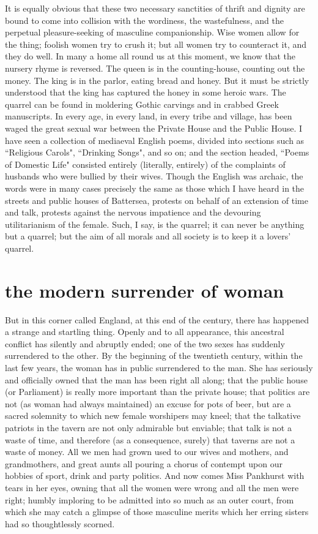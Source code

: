 \documentclass[final,10pt,letterpaper,twocolumn,openany]{book}
\begin{document}
It is equally obvious that these two necessary sanctities of thrift and
dignity are bound to come into collision with the wordiness, the
wastefulness, and the perpetual pleasure-seeking of masculine
companionship. Wise women allow for the thing; foolish women try to
crush it; but all women try to counteract it, and they do well. In many a
home all round us at this moment, we know that the nursery rhyme is
reversed. The queen is in the counting-house, counting out the money. The
king is in the parlor, eating bread and honey. But it must be strictly
understood that the king has captured the honey in some heroic wars. The
quarrel can be found in moldering Gothic carvings and in crabbed Greek
manuscripts. In every age, in every land, in every tribe and village, has
been waged the great sexual war between the Private House and the Public
House. I have seen a collection of mediaeval English poems, divided into
sections such as ``Religious Carols", ``Drinking Songs", and so on; and the
section headed, ``Poems of Domestic Life" consisted entirely (literally,
entirely) of the complaints of husbands who were bullied by their wives.
Though the English was archaic, the words were in many cases precisely
the same as those which I have heard in the streets and public houses of
Battersea, protests on behalf of an extension of time and talk, protests
against the nervous impatience and the devouring utilitarianism of the
female. Such, I say, is the quarrel; it can never be anything but a quarrel;
but the aim of all morals and all society is to keep it a lovers' quarrel.

\section{the modern surrender of woman}

    But in this corner called England, at this end of the century, there has
happened a strange and startling thing. Openly and to all appearance, this
ancestral conflict has silently and abruptly ended; one of the two sexes has
suddenly surrendered to the other. By the beginning of the twentieth
century, within the last few years, the woman has in public surrendered to
the man. She has seriously and officially owned that the man has been
right all along; that the public house (or Parliament) is really more
important than the private house; that politics are not (as woman had
always maintained) an excuse for pots of beer, but are a sacred solemnity
to which new female worshipers may kneel; that the talkative patriots in
the tavern are not only admirable but enviable; that talk is not a waste of
time, and therefore (as a consequence, surely) that taverns are not a waste
of money. All we men had grown used to our wives and mothers, and
grandmothers, and great aunts all pouring a chorus of contempt upon our
hobbies of sport, drink and party politics. And now comes Miss Pankhurst
with tears in her eyes, owning that all the women were wrong and all the
men were right; humbly imploring to be admitted into so much as an outer
court, from which she may catch a glimpse of those masculine merits
which her erring sisters had so thoughtlessly scorned.
\end{document}
